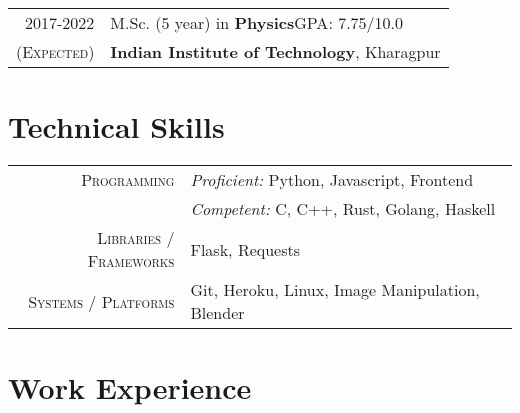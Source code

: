 \documentclass[a4paper,12pt]{extarticle} %
\let\oldtextbf\textbf
\renewcommand{\textbf}[1]{\textcolor{bold}{\oldtextbf{#1}}}
\begin{document}
\begin{tabular}{r|p{16cm}}	
2017-2022 & M.Sc. (5 year) in \textbf{Physics}\hfill\textsc{GPA}: 7.75/10.0\\
\textsc{(Expected)}&\textbf{Indian Institute of Technology}, Kharagpur\\
\end{tabular}


\vspace{0.5cm}



\section{\textcolor{primary}{Technical Skills}}

\begin{tabular}{r|p{13cm}}
\textsc{Programming} & \textit{Proficient:} Python, Javascript, Frontend\\
& \textit{Competent:} C, C++, Rust, Golang, Haskell \\
\textsc{Libraries / Frameworks} & Flask, Requests\\
\textsc{Systems / Platforms} & Git, Heroku, Linux, Image Manipulation, Blender\\
\end{tabular}

\vspace{0.5cm}




\section{\textcolor{primary}{Work Experience}}
\end{document}
